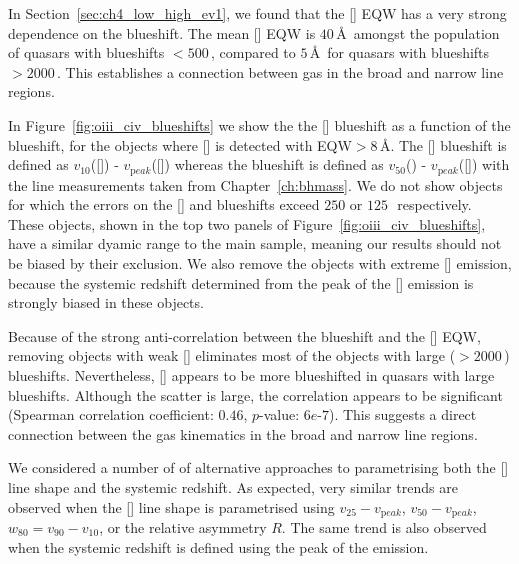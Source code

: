In Section~\ref{sec:ch4_low_high_ev1}, we found that the [] EQW has a very strong dependence on the  blueshift.
The mean [] EQW is $40$\,\AA\, amongst the population of quasars with  blueshifts $<500$\,\kms, compared to $5$\,\AA\, for quasars with  blueshifts $>2000$\,\kms. 
This establishes a connection between gas in the broad and narrow line regions. 

In Figure~\ref{fig:oiii_civ_blueshifts} we show the the [] blueshift as a function of the  blueshift, for the objects where [] is detected with EQW$>8$\,\AA. 
The [] blueshift is defined as $v_{10}$([]) - $v_{\mathrm peak}$([]) whereas the  blueshift is defined as $v_{50}$() - $v_{\mathrm peak}$([]) with the  line measurements taken from Chapter~\ref{ch:bhmass}.
We do not show objects for which the errors on the [] and  blueshifts exceed $250$ or $125$\,\kms\, respectively. 
These objects, shown in the top two panels of Figure~\ref{fig:oiii_civ_blueshifts}, have a similar dyamic range to the main sample, meaning our results should not be biased by their exclusion.  
We also remove the objects with extreme [] emission, because the systemic redshift determined from the peak of the [] emission is strongly biased in these objects. 

Because of the strong anti-correlation between the  blueshift and the [] EQW, removing objects with weak [] eliminates most of the objects with large ($>2000$\,\kms)  blueshifts.  
Nevertheless, [] appears to be more blueshifted in quasars with large  blueshifts.
Although the scatter is large, the correlation appears to be significant (Spearman correlation coefficient: $0.46$, $p$-value: $6e\text{-}7$). 
This suggests a direct connection between the gas kinematics in the broad and narrow line regions. 

We considered a number of of alternative approaches to parametrising both the [] line shape and the systemic redshift. 
As expected, very similar trends are observed when the [] line shape is parametrised using $v_{25} - v_{\mathrm peak}$, $v_{50} - v_{\mathrm peak}$, $w_{80} = v_{90} - v_{10}$, or the relative asymmetry $R$.
The same trend is also observed when the systemic redshift is defined using the peak of the \hb emission. 

